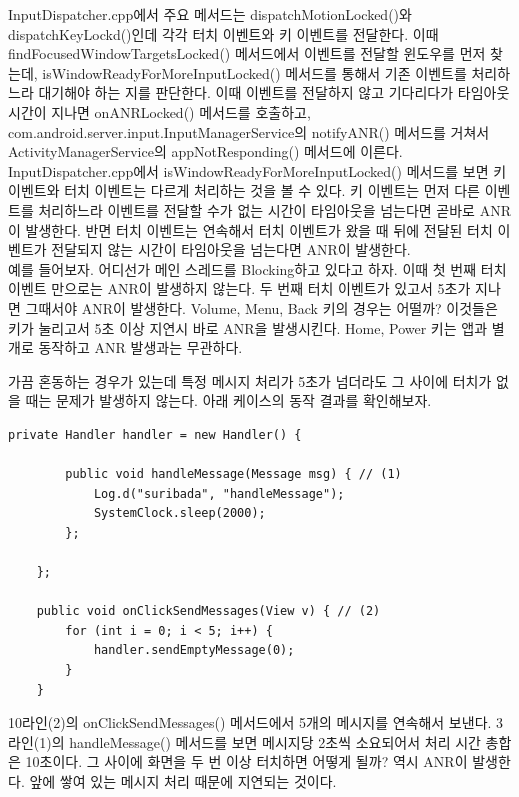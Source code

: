 InputDispatcher.cpp에서 주요 메서드는 dispatchMotionLocked()와 dispatchKeyLockd()인데 각각 터치 이벤트와 키 이벤트를 전달한다. 이때 findFocusedWindowTargetsLocked() 메서드에서 이벤트를 전달할 윈도우를 먼저 찾는데, isWindowReadyForMoreInputLocked() 메서드를 통해서 기존 이벤트를 처리하느라 대기해야 하는 지를 판단한다.
이때 이벤트를 전달하지 않고 기다리다가 타임아웃 시간이 지나면 onANRLocked() 메서드를 호출하고, com.android.server.input.InputManagerService의 notifyANR() 메서드를 거쳐서 ActivityManagerService의 appNotResponding() 메서드에 이른다.\\

InputDispatcher.cpp에서 isWindowReadyForMoreInputLocked() 메서드를 보면 키 이벤트와 터치 이벤트는 다르게 처리하는 것을 볼 수 있다. 키 이벤트는 먼저 다른 이벤트를 처리하느라 이벤트를 전달할 수가 없는 시간이 타임아웃을 넘는다면 곧바로 ANR이 발생한다. 반면 터치 이벤트는 연속해서 터치 이벤트가 왔을 때 뒤에 전달된 터치 이벤트가 전달되지 않는 시간이 타임아웃을 넘는다면 ANR이 발생한다.\\

예를 들어보자. 
어디선가 메인 스레드를 Blocking하고 있다고 하자.
이때 첫 번째 터치 이벤트 만으로는 ANR이 발생하지 않는다. 두 번째 터치 이벤트가 있고서 5초가 지나면 그때서야 ANR이 발생한다.
Volume, Menu, Back 키의 경우는 어떨까? 이것들은 키가 눌리고서 5초 이상 지연시 바로 ANR을 발생시킨다.
Home, Power 키는 앱과 별개로 동작하고 ANR 발생과는 무관하다.\\

가끔 혼동하는 경우가 있는데 특정 메시지 처리가 5초가 넘더라도 그 사이에 터치가 없을 때는 문제가 발생하지 않는다. 아래 케이스의 동작 결과를 확인해보자. 
\begin{lstlisting}[frame=single] 
 	private Handler handler = new Handler() {

		public void handleMessage(Message msg) { // (1)
			Log.d("suribada", "handleMessage");
			SystemClock.sleep(2000);
		};

	};

	public void onClickSendMessages(View v) { // (2)
		for (int i = 0; i < 5; i++) {
			handler.sendEmptyMessage(0);
		}
	}
\end{lstlisting}
10라인(2)의 onClickSendMessages() 메서드에서 5개의 메시지를 연속해서 보낸다.
3라인(1)의 handleMessage() 메서드를 보면 메시지당 2초씩 소요되어서 처리 시간 총합은 10초이다. 그 사이에 화면을 두 번 이상 터치하면 어떻게 될까? 역시 ANR이 발생한다. 앞에 쌓여 있는 메시지 처리 때문에 지연되는 것이다.\\

